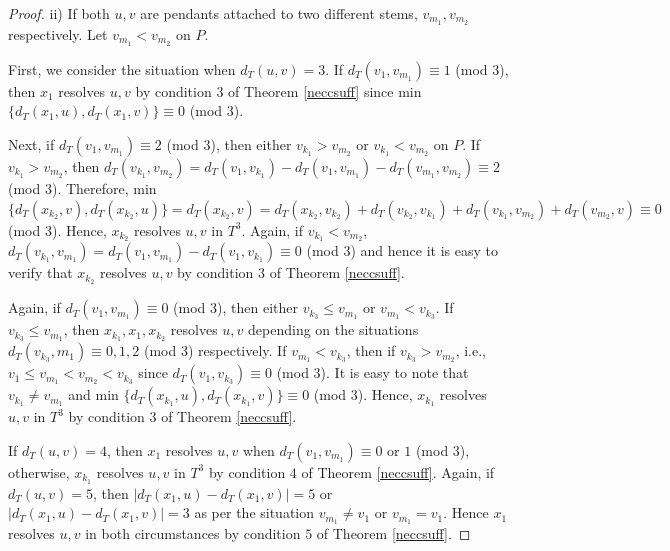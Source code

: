 \documentclass{article}
\theoremstyle{definition}
\numberwithin{equation}{section}
\begin{document}
\begin{proof}
ii) If both $u,v$ are pendants attached to two different stems, $v_{m_{1}}, v_{m_{2}}$ respectively. Let $v_{m_{1}}<v_{m_{2}}$ on $P$. 

\vspace{0.2em}
First, we consider the situation when $d_{T}(u,v)=3$. If $d_{T}(v_{1},v_{m_{1}})\equiv 1$ (mod $3$), then $x_{1}$ resolves $u,v$ by condition $3$ of Theorem \ref{neccsuff} since min$\{d_{T}(x_{1},u), d_{T}(x_{1},v)\}\equiv 0$ (mod $3$). 


Next, if $d_{T}(v_{1},v_{m_{1}})\equiv 2$ (mod $3$), then either $v_{k_{1}}>v_{m_{2}}$ or $v_{k_{1}}< v_{m_{2}}$ on $P$. If $v_{k_{1}}>v_{m_{2}}$, then
$d_{T}(v_{k_{1}},v_{m_{2}})=d_{T}(v_{1},v_{k_{1}})-d_{T}(v_{1},v_{m_{1}})-d_{T}(v_{m_{1}},v_{m_{2}})\equiv 2$ (mod $3$). Therefore, 
min $\{d_{T}(x_{k_{2}},v),d_{T}(x_{k_{2}},u)\}=d_{T}(x_{k_{2}},v)=d_{T}(x_{k_{2}},v_{k_{2}})+d_{T}(v_{k_{2}},v_{k_{1}})+d_{T}(v_{k_{1}},v_{m_{2}})+d_{T}(v_{m_{2}},v)\equiv 0$ (mod $3$). Hence, $x_{k_{2}}$ resolves $u,v$ in $T^{3}$. Again, if $v_{k_{1}}<v_{m_{2}}$, $d_{T}(v_{k_{1}},v_{m_{1}})=d_{T}(v_{1},v_{m_{1}})-d_{T}(v_{1},v_{k_{1}})\equiv 0$ (mod $3$) and hence it is easy to verify that $x_{k_{2}}$ resolves $u,v$ by condition $3$ of Theorem \ref{neccsuff}. 

Again, if $d_{T}(v_{1},v_{m_{1}})\equiv 0$ (mod $3$), then either $v_{k_{3}}\leq v_{m_{1}}$ or $v_{m_{1}}<v_{k_{3}}$. 
If $v_{k_{3}}\leq v_{m_{1}}$, then $x_{k_{1}},x_{1},x_{k_{2}}$ resolves $u,v$ depending on the situations $d_{T}(v_{k_{3}},m_{1})\equiv 0, 1,2$ (mod $3$) respectively. If $v_{m_{1}}<v_{k_{3}}$, then if   $v_{k_{3}}>v_{m_{2}}$, i.e., $v_{1}\leq v_{m_{1}}<v_{m_{2}}<v_{k_{3}}$ since $d_{T}(v_{1},v_{k_{3}})\equiv 0$ (mod $3$). It is easy to note that $v_{k_{1}}\neq v_{m_{1}}$ and min $\{d_{T}(x_{k_{1}},u),d_{T}(x_{k_{1}},v)\}\equiv 0$ (mod $3$). Hence, $x_{k_{1}}$ resolves $u,v$ in $T^{3}$ by condition $3$ of Theorem \ref{neccsuff}.


\vspace{0.2em}
If $d_{T}(u,v)=4$, then $x_{1}$ resolves $u,v$ when $d_{T}(v_{1},v_{m_{1}})\equiv 0$ or $1$ (mod $3$), otherwise, $x_{k_{1}}$ resolves $u,v$ in $T^{3}$ by condition $4$ of Theorem \ref{neccsuff}. Again, if $d_{T}(u,v)=5$, then $|d_{T}(x_{1},u)-d_{T}(x_{1},v)|=5$ or $|d_{T}(x_{1},u)-d_{T}(x_{1},v)|=3$ as per the situation $v_{m_{1}}\neq v_{1}$ or $v_{m_{1}}=v_{1}$.
Hence $x_{1}$ resolves $u,v$ in both circumstances by condition $5$ of Theorem \ref{neccsuff}. 
\end{proof}
\end{document}
